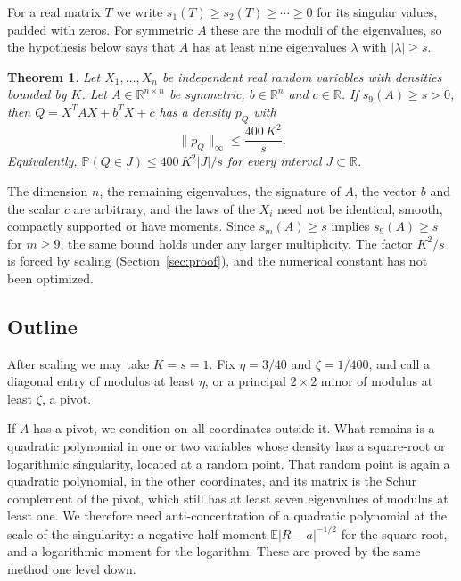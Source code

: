 \documentclass[11pt]{amsart}
\numberwithin{equation}{section}
\newtheorem{theorem}{Theorem}[section]
\theoremstyle{definition}
\theoremstyle{remark}
\newcommand{\R}{\mathbb R}
\newcommand{\E}{\mathbb E}
\newcommand{\PP}{\mathbb P}
\newcommand{\1}{\mathbf 1}
\newcommand{\norm}[1]{\lVert #1\rVert}
\newcommand{\abs}[1]{\lvert #1\rvert}
\begin{document}
For a real matrix $T$ we write $s_1(T)\ge s_2(T)\ge\cdots\ge0$ for its singular values, padded with zeros. For symmetric $A$ these are the moduli of the eigenvalues, so the hypothesis below says that $A$ has at least nine eigenvalues $\lambda$ with $\abs\lambda\ge s$.

\begin{theorem}\label{thm:main}
Let $X_1,\dots,X_n$ be independent real random variables with densities bounded by $K$. Let $A\in\R^{n\times n}$ be symmetric, $b\in\R^n$ and $c\in\R$. If $s_9(A)\ge s>0$, then $Q=X^TAX+b^TX+c$ has a density $p_Q$ with
\begin{equation}\label{eq:main}
\norm{p_Q}_\infty\le \frac{400\,K^2}{s}.
\end{equation}
Equivalently, $\PP(Q\in J)\le 400\,K^2\abs J/s$ for every interval $J\subset\R$.
\end{theorem}

The dimension $n$, the remaining eigenvalues, the signature of $A$, the vector $b$ and the scalar $c$ are arbitrary, and the laws of the $X_i$ need not be identical, smooth, compactly supported or have moments. Since $s_m(A)\ge s$ implies $s_9(A)\ge s$ for $m\ge9$, the same bound holds under any larger multiplicity. The factor $K^2/s$ is forced by scaling (Section~\ref{sec:proof}), and the numerical constant has not been optimized.

\subsection*{Outline}
After scaling we may take $K=s=1$. Fix $\eta=3/40$ and $\zeta=1/400$, and call a diagonal entry of modulus at least $\eta$, or a principal $2\times2$ minor of modulus at least $\zeta$, a pivot.

If $A$ has a pivot, we condition on all coordinates outside it. What remains is a quadratic polynomial in one or two variables whose density has a square-root or logarithmic singularity, located at a random point. That random point is again a quadratic polynomial, in the other coordinates, and its matrix is the Schur complement of the pivot, which still has at least seven eigenvalues of modulus at least one. We therefore need anti-concentration of a quadratic polynomial at the scale of the singularity: a negative half moment $\E\abs{R-a}^{-1/2}$ for the square root, and a logarithmic moment for the logarithm. These are proved by the same method one level down.
\end{document}
